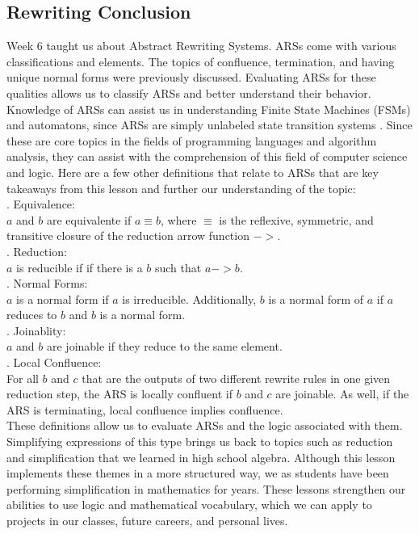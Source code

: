 \documentclass{article}
\theoremstyle{theorem}
\theoremstyle{definition}
\theoremstyle{remark}
\begin{document}
\subsection{Rewriting Conclusion}

Week 6 taught us about Abstract Rewriting Systems. ARSs come with various classifications and elements. The topics of confluence, termination, and having unique normal forms were previously discussed. Evaluating ARSs for these qualities allows us to classify ARSs and better understand their behavior. Knowledge of ARSs can assist us in understanding Finite State Machines (FSMs) and automatons, since ARSs are simply unlabeled state transition systems \cite{Ars}. Since these are core topics in the fields of programming languages and algorithm analysis, they can assist with the comprehension of this field of computer science and logic. Here are a few other definitions that relate to ARSs that are key takeaways from this lesson and further our understanding of the topic:
\\. Equivalence:
\\\indent $a$ and $b$ are equivalente if $a \equiv b$, where $\equiv$ is the reflexive, symmetric, and transitive closure of the reduction arrow function $->$.
\\. Reduction:
\\\indent $a$ is reducible if if there is a $b$ such that $a -> b$.
\\. Normal Forms:
\\\indent $a$ is a normal form if $a$ is irreducible. Additionally, $b$ is a normal form of $a$ if $a$ reduces to $b$ and $b$ is a normal form. 
\\. Joinablity:
\\\indent $a$ and $b$ are joinable if they reduce to the same element.
\\. Local Confluence:
\\\indent For all $b$ and $c$ that are the outputs of two different rewrite rules in one given reduction step, the ARS is locally confluent if $b$ and $c$ are joinable. As well, if the ARS is terminating, local confluence implies confluence. 
\\\indent These definitions allow us to evaluate ARSs and the logic associated with them. Simplifying expressions of this type brings us back to topics such as reduction and simplification that we learned in high school algebra. Although this lesson implements these themes in a more structured way, we as students have been performing simplification in mathematics for years. These lessons strengthen our abilities to use logic and mathematical vocabulary, which we can apply to projects in our classes, future careers, and personal lives. 
\end{document}
